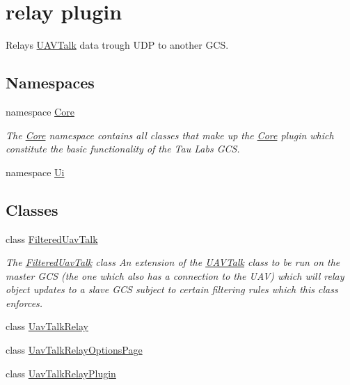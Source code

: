 \hypertarget{group___u_a_v_talk}{\section{relay plugin}
\label{group___u_a_v_talk}
}


Relays \hyperlink{class_u_a_v_talk}{U\-A\-V\-Talk} data trough U\-D\-P to another G\-C\-S.  


\subsection*{Namespaces}
\begin{DoxyCompactItemize}
\item 
namespace \hyperlink{namespace_core}{Core}
\begin{DoxyCompactList}\small\item\em The \hyperlink{namespace_core}{Core} namespace contains all classes that make up the \hyperlink{namespace_core}{Core} plugin which constitute the basic functionality of the Tau Labs G\-C\-S. \end{DoxyCompactList}\item 
namespace \hyperlink{namespace_ui}{Ui}
\end{DoxyCompactItemize}
\subsection*{Classes}
\begin{DoxyCompactItemize}
\item 
class \hyperlink{class_filtered_uav_talk}{Filtered\-Uav\-Talk}
\begin{DoxyCompactList}\small\item\em The \hyperlink{class_filtered_uav_talk}{Filtered\-Uav\-Talk} class An extension of the \hyperlink{class_u_a_v_talk}{U\-A\-V\-Talk} class to be run on the master G\-C\-S (the one which also has a connection to the U\-A\-V) which will relay object updates to a slave G\-C\-S subject to certain filtering rules which this class enforces. \end{DoxyCompactList}\item 
class \hyperlink{class_uav_talk_relay}{Uav\-Talk\-Relay}
\item 
class \hyperlink{class_uav_talk_relay_options_page}{Uav\-Talk\-Relay\-Options\-Page}
\item 
class \hyperlink{class_uav_talk_relay_plugin}{Uav\-Talk\-Relay\-Plugin}
\end{DoxyCompactItemize}
